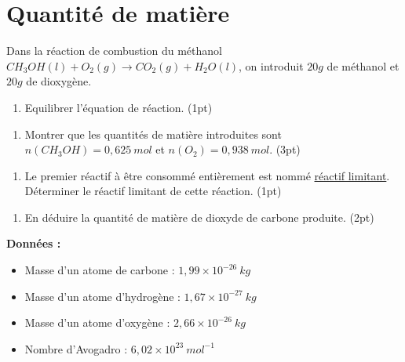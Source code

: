 \documentclass[a4paper,11pt,fleqn]{scrartcl}%
\begin{document}
\section{Quantité de matière}
Dans la réaction  de combustion du méthanol $CH_3OH(l) + O_2(g) \rightarrow CO_2(g) + H_2O(l)$, on introduit $20g$ de méthanol et $20g$ de dioxygène.

\begin{enumerate}
    \item Equilibrer l’équation de réaction. (1pt)
    \end{enumerate}
    \noindent\fbox{
    \begin{minipage}{\textwidth}
        \TextField[
            multiline=true,
            width=\linewidth,
            height=2em
        ]{}
    \end{minipage}
}
    \begin{enumerate}[resume]
    \item Montrer que les quantités de matière introduites sont $n(CH_3OH) = 0,625~mol$ et $n(O_2) = 0,938~mol$. (3pt)
    \end{enumerate}
    \noindent\fbox{
    \begin{minipage}{\textwidth}
        \TextField[
            multiline=true,
            width=\linewidth,
            height=10em
        ]{}
    \end{minipage}
}
    \begin{enumerate}[resume]
    \item Le premier réactif à être consommé entièrement est nommé \underline{réactif limitant}. Déterminer le réactif limitant de cette réaction. (1pt)
    \end{enumerate}
    \noindent\fbox{
    \begin{minipage}{\textwidth}
        \TextField[
            multiline=true,
            width=\linewidth,
            height=8em
        ]{}
    \end{minipage}
}
    \begin{enumerate}[resume]
    \item En déduire la quantité de matière de dioxyde de carbone produite. (2pt)
\end{enumerate}
\noindent\fbox{
    \begin{minipage}{\textwidth}
        \TextField[
            multiline=true,
            width=\linewidth,
            height=8em
        ]{}
    \end{minipage}
}

\textbf{Données :}
\begin{itemize}
    \item Masse d'un atome de carbone : $1,99 \times 10^{-26}~kg$
    \item Masse d'un atome d'hydrogène : $1,67 \times 10^{-27}~kg$
    \item Masse d'un atome d'oxygène : $2,66 \times 10^{-26}~kg$
    \item Nombre d'Avogadro : $6,02 \times 10^{23}~mol^{-1}$
\end{itemize}
\end{document}
